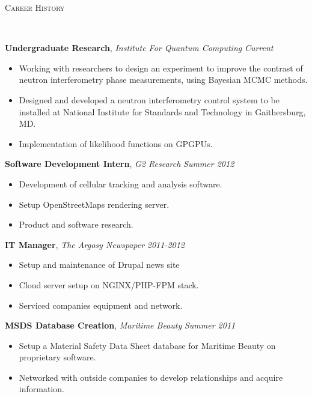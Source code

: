 \documentclass[9pt]{article}
\newenvironment{changemargin}[2]{%
  \begin{list}{}{%
    \setlength{\topsep}{0pt}%
    \setlength{\leftmargin}{#1}%
    \setlength{\rightmargin}{#2}%
    \setlength{\listparindent}{\parindent}%
    \setlength{\itemindent}{\parindent}%
    \setlength{\parsep}{\parskip}%
  }%
  \item[]}{\end{list}
}
\newcommand{\lineover}{
	\begin{changemargin}{-0.05in}{-0.05in}
		\vspace*{-8pt}
		\hrulefill \\
		\vspace*{-2pt}
	\end{changemargin}
}
\newcommand{\header}[1]{
	\begin{changemargin}{-0.5in}{-0.5in}
		\scshape{#1}\\
  	\lineover
	\end{changemargin}
}
\newenvironment{body} {
	\vspace*{-16pt}
	\begin{changemargin}{-0.25in}{-0.5in}
  }	
	{\end{changemargin}
}
\begin{document}
\smallskip


\header{Career History}

\begin{body}
	\vspace{14pt}
	\textbf{Undergraduate Research}, \emph{Institute For Quantum Computing} \hfill \emph{Current}\\
	\vspace*{-4pt}
	\begin{itemize} \itemsep -0pt  %
		\item Working with researchers to design an experiment to improve the contrast of neutron interferometry phase measurements, using Bayesian MCMC methods.  
		\item Designed and developed a neutron interferometry control system to be installed at National Institute for Standards and Technology in Gaithersburg, MD.
		\item Implementation of likelihood functions on GPGPUs. 

	\end{itemize}
	\textbf{Software Development Intern}, \emph{G2 Research} \hfill \emph{Summer 2012}\\
	\vspace*{-4pt}
	\begin{itemize} \itemsep -0pt  %
		\item Development of cellular tracking and analysis software.
		\item Setup OpenStreetMaps rendering server.
		\item Product and software research.
	\end{itemize}

	\textbf {IT Manager}, \emph{The Argosy Newspaper} \hfill \emph{2011-2012}\\
	\vspace*{-4pt}
	\begin{itemize} \itemsep -0pt
		\item Setup and maintenance of Drupal news site
		\item Cloud server setup on NGINX/PHP-FPM stack. 
		\item Serviced companies equipment and network. 
	\end{itemize}

	\textbf {MSDS Database Creation}, \emph{Maritime Beauty} \hfill \emph{Summer 2011}\\
	\vspace*{-4pt}
	\begin{itemize} \itemsep -0pt
		\item Setup a Material Safety Data Sheet database for Maritime Beauty on proprietary software. 
		\item Networked with outside companies to develop relationships and acquire information. 
	\end{itemize}


\end{body}
\end{document}
